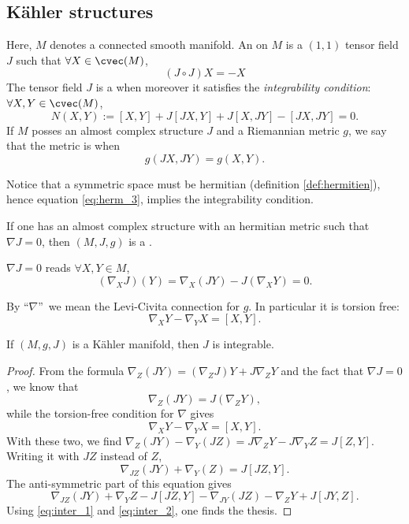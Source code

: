 \subsection{Kähler structures}


Here, $M$ denotes a connected smooth manifold. An  on $M$ is a $(1,1)$ tensor field $J$ such that $\forall X\in\cvec(M)$,
\[
   (J\circ J)X=-X
\]
The tensor field $J$ is a  when moreover it satisfies the \emph{integrability condition}: $\forall X,Y\in\cvec(M)$,
\begin{equation}  \label{DefComplStruct}
   N(X,Y):=[X,Y]+J[JX,Y]+J[X,JY]-[JX,JY]=0.
\end{equation}
If $M$ posses an almost complex structure $J$ and a Riemannian metric $g$, we say that the metric is  when 
\[
   g(JX,JY)=g(X,Y).
\]

Notice that a symmetric space must be hermitian (definition \ref{def:hermitien}), hence equation \eqref{eq:herm_3}, implies the integrability condition. 

\begin{definition}
If one has an almost complex structure with an hermitian metric such that $\nabla J=0$, then $(M,J,g)$ is a .
\end{definition}

\begin{remark}
$\nabla J=0$ reads $\forall X,Y\in M$,
\[
    (\nabla_XJ)(Y)=\nabla_X(JY)-J(\nabla_XY)=0.
\]
\end{remark}

\begin{remark}
By ``$\nabla$''\ we mean the Levi-Civita connection for $g$. In particular it is torsion free:
\[
   \nabla_XY-\nabla_YX=[X,Y].
\]
\end{remark}

\begin{lemma}
If $(M,g,J)$ is a Kähler manifold, then $J$ is integrable.
\end{lemma}

\begin{proof}
From the formula $\nabla_Z(JY)=(\nabla_ZJ)Y+J\nabla_ZY$ and the fact that $\nabla J=0$, we know that 
\begin{equation}\label{eq:inter_1}
  \nabla_Z(JY)=J(\nabla_ZY),
\end{equation}
while the torsion-free condition for $\nabla$ gives
\begin{equation}\label{eq:inter_2}
\nabla_XY-\nabla_YX=[X,Y].
\end{equation}
With these two, we find $\nabla_Z(JY)-\nabla_Y(JZ)=J\nabla_ZY-J\nabla_YZ=J[Z,Y]$.  Writing it with $JZ$ instead of $Z$,
\[
   \nabla_{JZ}(JY)+\nabla_Y(Z)=J[JZ,Y].
\]
The anti-symmetric part of this equation gives
\[
   \nabla_{JZ}(JY)+\nabla_YZ-J[JZ,Y]-\nabla_{JY}(JZ)-\nabla_ZY+J[JY,Z].
\]
Using \eqref{eq:inter_1} and \eqref{eq:inter_2}, one finds the thesis.

\end{proof}

